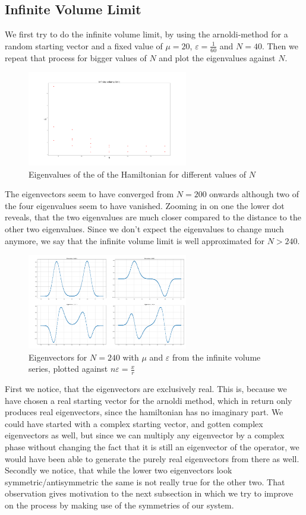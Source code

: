 \documentclass[11pt, letterpaper, onecolumn]{article}
\begin{document}
 	\subsection{Infinite Volume Limit}
  	We first try to do the infinite volume limit, by using the arnoldi-method for a random starting vector and a fixed value of $\mu=20$, $\varepsilon=\frac{1}{60}$ and $N=40$. Then we repeat that process for bigger values of $N$ and plot the eigenvalues against $N$.
    	\begin{figure} [h] 
	\begin{center}
	\includegraphics[width=7cm]{"inf_vol_lim.png"}
	\caption{Eigenvalues of the of the Hamiltonian for different values of $N$}
	\end{center}
	\end{figure}
	The eigenvectors seem to have converged from $N=200$ onwards although two of the four eigenvalues seem to have vanished. Zooming in on one the lower dot reveals, that the two eigenvalues are much closer compared to the distance to the other two eigenvalues. Since we don't expect the eigenvalues to change much anymore, we say that the infinite volume limit is well approximated for $N>240$. 
 	\begin{figure} [h] 
	\begin{center}
	\includegraphics[width=7cm]{"eigenvectors_noParity.png"}
	\caption{Eigenvectors for $N=240$ with $\mu$ and $\varepsilon$ from the infinite volume series, plotted against $n\varepsilon=\frac{x}{r}$}
	\end{center}
	\end{figure}
 	First we notice, that the eigenvectors are exclusively real. This is, because we have chosen a real starting vector for the arnoldi method, which in return only produces real eigenvectors, since the hamiltonian has no imaginary part. We could have started with a complex starting vector, and gotten complex eigenvectors as well, but since we can multiply any eigenvector by a complex phase without changing the fact that it is still an eigenvector of the operator, we would have been able to generate the purely real eigenvectors from there as well.
	Secondly we notice, that while the lower two eigenvectors look symmetric/antisymmetric the same is not really true for the other two. That observation gives motivation to the next subsection in which we try to improve on the process by making use of the symmetries of our system.
\end{document}
